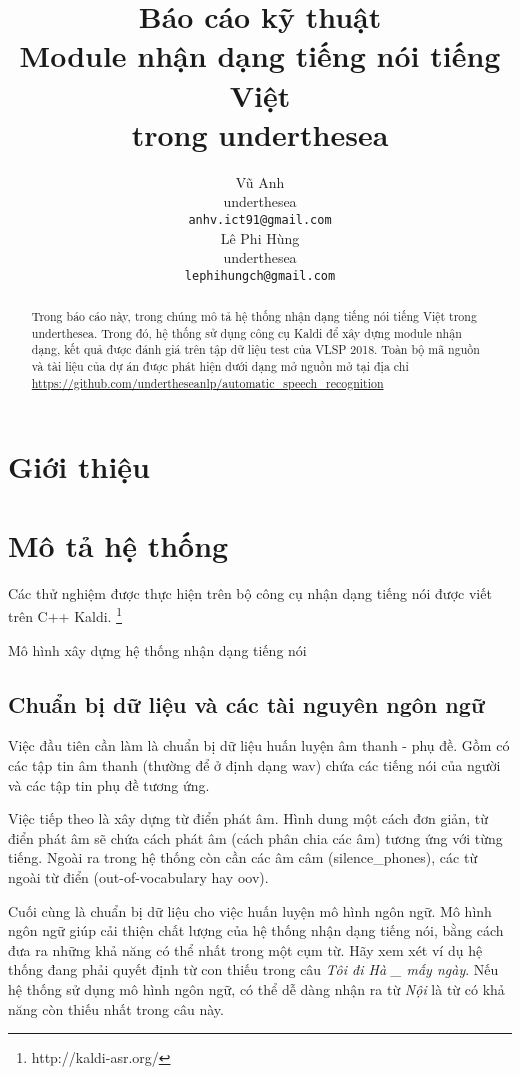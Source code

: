 \documentclass[11pt,a4paper]{article}
\title{Báo cáo kỹ thuật\\Module nhận dạng tiếng nói tiếng Việt\\ trong underthesea}
\author{
Vũ Anh\\
underthesea\\
{\tt anhv.ict91@gmail.com} \\
\And
Lê Phi Hùng \\
underthesea\\
{\tt lephihungch@gmail.com} \\
}
\date{}
\begin{document}
\maketitle
\begin{abstract}

Trong báo cáo này, trong chúng mô tả hệ thống nhận dạng tiếng nói tiếng Việt trong underthesea. Trong đó, hệ thống sử dụng công cụ Kaldi để xây dựng module nhận dạng, kết quả được đánh giá trên tập dữ liệu test của VLSP 2018. Toàn bộ mã nguồn và tài liệu của dự án được phát hiện dưới dạng mở nguồn mở tại địa chỉ \url{https://github.com/undertheseanlp/automatic_speech_recognition}

\end{abstract}

\section{Giới thiệu}

\section{Mô tả hệ thống}

Các thử nghiệm được thực hiện trên bộ công cụ nhận dạng tiếng nói được viết trên C++ Kaldi. \footnote{http://kaldi-asr.org/}

Mô hình xây dựng hệ thống nhận dạng tiếng nói

\subsection{Chuẩn bị dữ liệu và các tài nguyên ngôn ngữ}

Việc đầu tiên cần làm là chuẩn bị dữ liệu huấn luyện âm thanh - phụ đề.
Gồm có các tập tin âm thanh (thường để ở định dạng wav) chứa các tiếng nói của người và các tập tin phụ đề tương ứng.

Việc tiếp theo là xây dựng từ điển phát âm.
Hình dung một cách đơn giản, từ điển phát âm sẽ chứa cách phát âm (cách phân chia các âm) tương ứng với từng tiếng.
Ngoài ra trong hệ thống còn cần các âm câm (silence\_phones), các từ ngoài từ điển (out-of-vocabulary hay oov).


Cuối cùng là chuẩn bị dữ liệu cho việc huấn luyện mô hình ngôn ngữ.
Mô hình ngôn ngữ giúp cải thiện chất lượng của hệ thống nhận dạng tiếng nói, bằng cách đưa ra những khả năng có thể nhất trong một cụm từ.
Hãy xem xét ví dụ hệ thống đang phải quyết định từ con thiếu trong câu \textit{Tôi đi Hà \_ mấy ngày}.
Nếu hệ thống sử dụng mô hình ngôn ngữ, có thể dễ dàng nhận ra từ \textit{Nội} là từ có khả năng còn thiếu nhất trong câu này.
\end{document}
